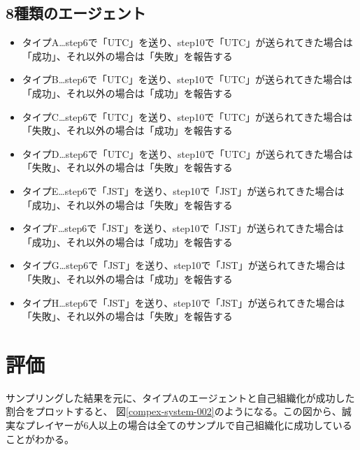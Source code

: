   \subsection{8種類のエージェント}
    \begin{itemize}
      \item タイプA…step6で「UTC」を送り、step10で「UTC」が送られてきた場合は「成功」、それ以外の場合は「失敗」を報告する
      \item タイプB…step6で「UTC」を送り、step10で「UTC」が送られてきた場合は「成功」、それ以外の場合は「成功」を報告する
      \item タイプC…step6で「UTC」を送り、step10で「UTC」が送られてきた場合は「失敗」、それ以外の場合は「成功」を報告する
      \item タイプD…step6で「UTC」を送り、step10で「UTC」が送られてきた場合は「失敗」、それ以外の場合は「失敗」を報告する
      \item タイプE…step6で「JST」を送り、step10で「JST」が送られてきた場合は「成功」、それ以外の場合は「失敗」を報告する
      \item タイプF…step6で「JST」を送り、step10で「JST」が送られてきた場合は「成功」、それ以外の場合は「成功」を報告する
      \item タイプG…step6で「JST」を送り、step10で「JST」が送られてきた場合は「失敗」、それ以外の場合は「成功」を報告する
      \item タイプH…step6で「JST」を送り、step10で「JST」が送られてきた場合は「失敗」、それ以外の場合は「失敗」を報告する
    \end{itemize}

\section{評価}
サンプリングした結果を元に、タイプAのエージェントと自己組織化が成功した割合をプロットすると、
図\ref{compex-system-002}のようになる。この図から、誠実なプレイヤーが6人以上の場合は全てのサンプルで自己組織化に成功していることがわかる。

